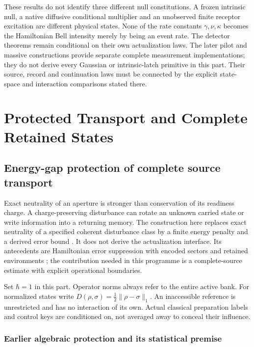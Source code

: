 \documentclass[11pt,oneside,openany]{book}
\theoremstyle{definition}
\theoremstyle{remark}\newtheorem{remark}[theorem]{Remark}
\begin{document}
These results do not identify three different null constitutions. A frozen
intrinsic null, a native diffusive conditional multiplier and an unobserved
finite receptor excitation are different physical states. None of the rate
constants $\gamma,\nu,\kappa$ becomes the Hamiltonian Bell intensity merely
by being an event rate. The detector theorems remain conditional on their
own actualization laws. The later pilot and massive constructions provide
separate complete measurement implementations; they do not derive every
Gaussian or intrinsic-latch primitive in this part. Their source, record
and continuation laws must be connected by the explicit state-space and
interaction comparisons stated there.


\part{Protected Transport and Complete Retained States}\label{part:protection}

\chapter{Energy-gap protection of complete source transport}
\label{prot:gapchapter}

Exact neutrality of an aperture is stronger than conservation of its readiness charge. A charge-preserving disturbance can rotate an unknown carried state or write information into a returning memory. The construction here replaces exact neutrality of a specified coherent disturbance class by a finite energy penalty and a derived error bound \cite{M17}. It does not derive the actualization interface. Its antecedents are Hamiltonian error suppression with encoded sectors and retained environments \cite{MarvianLidar}; the contribution needed in this programme is a complete-source estimate with explicit operational boundaries.

Set $\hbar=1$ in this part. Operator norms always refer to the entire active bank. For normalized states write $D(\rho,\sigma)=\tfrac12\|\rho-\sigma\|_1$. An inaccessible reference is unrestricted and has no interaction of its own. Actual classical preparation labels and control keys are conditioned on, not averaged away to conceal their influence.

\section{Earlier algebraic protection and its statistical premise}
\label{prot:ancestral}
\end{document}
